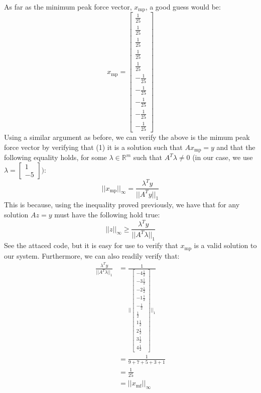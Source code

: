 \documentclass[12pt]{exam}
\begin{document}
\begin{questions}
\begin{solution}
    As far as the minimum peak force vector, $x_{\text{mp}}$, a good guess would be:
    \[
      x_{\text{mp}} =
        \begin{bmatrix}
          \frac{1}{25} \\
          \frac{1}{25} \\
          \frac{1}{25} \\
          \frac{1}{25} \\
          \frac{1}{25} \\
          -\frac{1}{25} \\
          -\frac{1}{25} \\
          -\frac{1}{25} \\
          -\frac{1}{25} \\
          -\frac{1}{25} 
        \end{bmatrix}
    \]
    Using a similar argument as before, we can verify the above is the mimum peak force vector by verifying that (1) it is a solution such that $Ax_{\text{mp}} = y$ and that the following equality holds, for some $\lambda \in \mathbb{R}^m$ such that $A^T\lambda \neq 0$ (in our case, we use $\lambda = \begin{bmatrix} 1 \\ -5 \end{bmatrix})$:
    \[
      ||x_{\text{mp}}||_{\infty} = \frac{\lambda^T y}{||A^Ty||_{1}}
    \]
    This is because, using the inequality proved previously, we have that for any solution $Az = y$ must have the following hold true:
    \[
    ||z||_{\infty} \geq \frac{\lambda^T y}{||A^T\lambda||_1}
    \]
    See the attaced code, but it is easy for use to verify that $x_{\text{mp}}$ is a valid solution to our system. Furthermore, we can also readily verify that:
    \begin{align*}
      \frac{\lambda^T y}{|| A^T \lambda ||_1} &= \frac{1}{||\begin{bmatrix}
          -4\frac{1}{2} \\
          -3\frac{1}{2} \\
          -2\frac{1}{2} \\
          -1\frac{1}{2} \\
          -\frac{1}{2} \\
          \frac{1}{2} \\
          1\frac{1}{2} \\
          2\frac{1}{2} \\
          3\frac{1}{2} \\
          4\frac{1}{2}
        \end{bmatrix}||_{1}} \\
        &= \frac{1}{9 + 7 + 5 + 3 + 1} \\
        &= \frac{1}{25} \\
        &= ||x_{\text{mf}}||_{\infty}
    \end{align*}
  \end{solution}


\end{questions}
\end{document}
